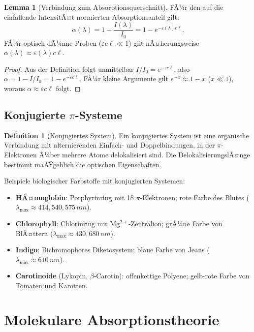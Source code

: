 ﻿\documentclass[a4paper,12pt]{article}
\theoremstyle{definition}
\newtheorem{definition}{Definition}
\newtheorem{lemma}{Lemma}
\begin{document}
\begin{lemma}[Verbindung zum Absorptionsquerschnitt]
\label{lem:querschnitt}
FÃ¼r den auf die einfallende IntensitÃ¤t normierten Absorptionsanteil gilt:
\[
  \alpha(\lambda) = 1 - \frac{I(\lambda)}{I_0} = 1 - e^{-\varepsilon(\lambda) c \ell}.
\]
FÃ¼r optisch dÃ¼nne Proben ($\varepsilon c \ell \ll 1$) gilt nÃ¤herungsweise
$\alpha(\lambda) \approx \varepsilon(\lambda) c \ell$.
\end{lemma}

\begin{proof}
Aus der Definition folgt unmittelbar $I/I_0 = e^{-\varepsilon c \ell}$, also
$\alpha = 1 - I/I_0 = 1 - e^{-\varepsilon c \ell}$.
FÃ¼r kleine Argumente gilt $e^{-x} \approx 1 - x$ ($x \ll 1$), woraus
$\alpha \approx \varepsilon c \ell$ folgt.
\end{proof}

\subsection{Konjugierte $\pi$-Systeme}

\begin{definition}[Konjugiertes System]
Ein konjugiertes System ist eine organische Verbindung mit alternierenden Einfach- und
Doppelbindungen, in der $\pi$-Elektronen Ã¼ber mehrere Atome delokalisiert sind.
Die DelokalisierungslÃ¤nge bestimmt maÃŸgeblich die optischen Eigenschaften.
\end{definition}

Beispiele biologischer Farbstoffe mit konjugierten Systemen:
\begin{itemize}
  \item \textbf{HÃ¤moglobin}: Porphyrinring mit 18 $\pi$-Elektronen; rote Farbe des Blutes ($\lambda_{\max} \approx 414, 540, 575\,\si{nm}$).
  \item \textbf{Chlorophyll}: Chlorinring mit $\mathrm{Mg}^{2+}$-Zentralion; grÃ¼ne Farbe von BlÃ¤ttern ($\lambda_{\max} \approx 430, 680\,\si{nm}$).
  \item \textbf{Indigo}: Bichromophores Diketosystem; blaue Farbe von Jeans ($\lambda_{\max} \approx 610\,\si{nm}$).
  \item \textbf{Carotinoide} (Lykopin, $\beta$-Carotin): offenkettige Polyene; gelb-rote Farbe von Tomaten und Karotten.
\end{itemize}

\section{Molekulare Absorptionstheorie}
\end{document}
